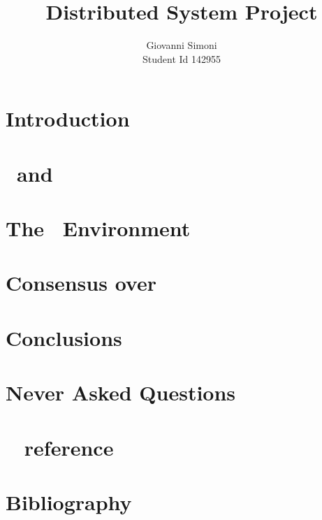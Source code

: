 \documentclass[a4paper]{article}
\title{Distributed System Project}
\author{Giovanni Simoni\\ Student Id 142955}
\begin{document}
    \maketitle
    \newpage

    \tableofcontents
    \newpage

    \section{Introduction}
    

    \section{\Erlang\ and \OTP} \label{sec:erlang-and-otp}
    

    \section{The \YUNA\ Environment} \label{sec:the-yuna-environment}
    

    \section{Consensus over \YUNA}
    

    \section{Conclusions}
    

    \section{Never Asked Questions}
    

    \section{\YUNA\  reference} \label{sec:yuna-api-reference}
    

    \section{Bibliography}
    
\end{document}
